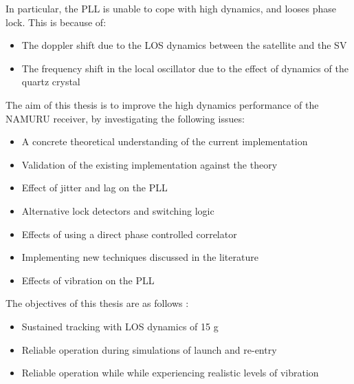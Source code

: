In particular, the \ac{PLL} is unable to cope with high dynamics, and looses phase lock. This is because of: 
\begin{itemize}
\item{The doppler shift due to the \ac{LOS} dynamics between the satellite and the \ac{SV}}
\item{The frequency shift in the local oscillator due to the effect of dynamics of the quartz crystal}
\end{itemize}

The aim of this thesis is to improve the high dynamics performance of the \ac{NAMURU} receiver, by investigating the following issues:  

\begin{itemize}
\item{A concrete theoretical understanding of the current implementation}
\item{Validation of the existing implementation against the theory}
\item{Effect of jitter and lag on the \ac{PLL}}
\item{Alternative lock detectors and switching logic}
\item{Effects of using a direct phase controlled correlator}
\item{Implementing new techniques discussed in the literature}
\item{Effects of vibration on the \ac{PLL}}
\end{itemize}

The objectives of this thesis are as follows : 
\begin{itemize}
\item{Sustained tracking with \ac{LOS} dynamics of 15 g}
\item{Reliable operation during simulations of launch and re-entry}
\item{Reliable operation while while experiencing realistic levels of vibration}
\end{itemize}
